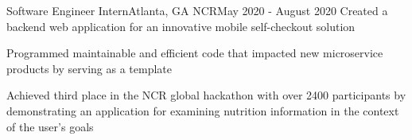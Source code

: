 \resumeSubheading
{Software Engineer Intern}{Atlanta, GA}
{NCR}{May 2020 - August 2020}
\resumeItemListStart
\resumeItem
{
  Created a backend web application for an innovative mobile self-checkout solution
}

\resumeItem
{
  Programmed maintainable and efficient code that impacted new microservice
  products by serving as a template
}

\resumeItem
{
  Achieved third place in the NCR global hackathon with over 2400 participants
  by demonstrating an application for examining nutrition information in the
  context of the user's goals
}
\resumeItemListEnd

